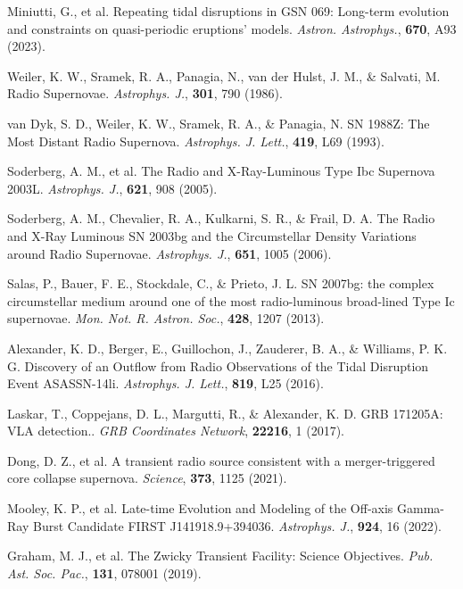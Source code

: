\documentclass{nature_plusfigure}
\newcommand{\mn}{{Mon. Not. R. Astron. Soc.}}
\newcommand{\mnras}{\mn}
\newcommand{\apj}{{Astrophys. J.}}
\newcommand{\apjl}{{Astrophys. J. Lett.}}
\newcommand{\aap}{{Astron. Astrophys.}}
\newcommand{\pasp}{{Pub. Ast. Soc. Pac.}}
\begin{document}
\begin{methods}
\begin{thebibliography}{10}
 Miniutti, G., et al. Repeating tidal disruptions in GSN 069: Long-term evolution and constraints on quasi-periodic eruptions' models. \emph{\aap}, \textbf{670}, A93 (2023). 


 Weiler, K. W., Sramek, R. A., Panagia, N., van der Hulst, J. M., \& Salvati, M. Radio Supernovae. \emph{\apj}, \textbf{301}, 790 (1986). 

 van Dyk, S. D., Weiler, K. W., Sramek, R. A., \& Panagia, N. SN 1988Z: The Most Distant Radio Supernova. \emph{\apjl}, \textbf{419}, L69 (1993). 

 Soderberg, A. M., et al. The Radio and X-Ray-Luminous Type Ibc Supernova 2003L. \emph{\apj}, \textbf{621}, 908 (2005). 

 Soderberg, A. M., Chevalier, R. A., Kulkarni, S. R., \& Frail, D. A. The Radio and X-Ray Luminous SN 2003bg and the Circumstellar Density Variations around Radio Supernovae. \emph{\apj}, \textbf{651}, 1005 (2006). 

 Salas, P., Bauer, F. E., Stockdale, C., \& Prieto, J. L. SN 2007bg: the complex circumstellar medium around one of the most radio-luminous broad-lined Type Ic supernovae. \emph{\mnras}, \textbf{428}, 1207 (2013). 

 Alexander, K. D., Berger, E., Guillochon, J., Zauderer, B. A., \& Williams, P. K. G. Discovery of an Outflow from Radio Observations of the Tidal Disruption Event ASASSN-14li. \emph{\apjl}, \textbf{819}, L25 (2016). 

 Laskar, T., Coppejans, D. L., Margutti, R., \& Alexander, K. D. GRB 171205A: VLA detection.. \emph{GRB Coordinates Network}, \textbf{22216}, 1 (2017). 

 Dong, D. Z., et al. A transient radio source consistent with a merger-triggered core collapse supernova. \emph{Science}, \textbf{373}, 1125 (2021). 

 Mooley, K. P., et al. Late-time Evolution and Modeling of the Off-axis Gamma-Ray Burst Candidate FIRST J141918.9+394036. \emph{\apj}, \textbf{924}, 16 (2022). 



 Graham, M. J., et al. The Zwicky Transient Facility: Science Objectives. \emph{\pasp}, \textbf{131}, 078001 (2019). 


\end{thebibliography}
\end{methods}
\end{document}
